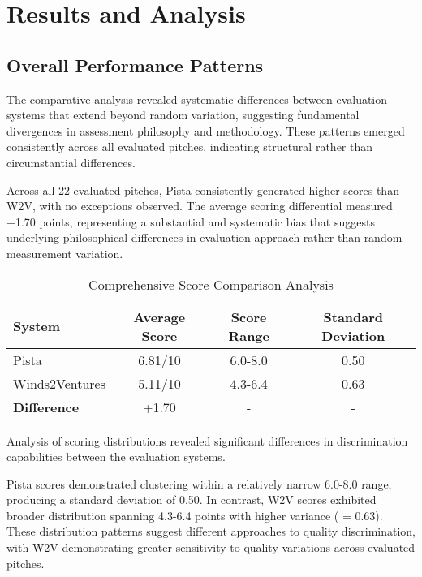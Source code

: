 \section{Results and Analysis}
\label{sec:results}

\subsection{Overall Performance Patterns}
\label{subsec:performance}

The comparative analysis revealed systematic differences between evaluation systems that extend beyond random variation, suggesting fundamental divergences in assessment philosophy and methodology. These patterns emerged consistently across all evaluated pitches, indicating structural rather than circumstantial differences.

Across all 22 evaluated pitches, Pista consistently generated higher scores than W2V, with no exceptions observed. The average scoring differential measured +1.70 points, representing a substantial and systematic bias that suggests underlying philosophical differences in evaluation approach rather than random measurement variation.

\begin{table}[ht]
    \centering
    \caption{Comprehensive Score Comparison Analysis}
    \label{tab:score-comparison}
    \begin{tabular}{lccc}
        \toprule
        \textbf{System} & \textbf{Average Score} & \textbf{Score Range} & \textbf{Standard Deviation} \\
        \midrule
        Pista & 6.81/10 & 6.0-8.0 & 0.50 \\
        Winds2Ventures & 5.11/10 & 4.3-6.4 & 0.63 \\
        \midrule
        \textbf{Difference} & +1.70 & - & - \\
        \bottomrule
    \end{tabular}
\end{table}

Analysis of scoring distributions revealed significant differences in discrimination capabilities between the evaluation systems.

Pista scores demonstrated clustering within a relatively narrow 6.0-8.0 range, producing a standard deviation of 0.50. In contrast, W2V scores exhibited broader distribution spanning 4.3-6.4 points with higher variance ( = 0.63). These distribution patterns suggest different approaches to quality discrimination, with W2V demonstrating greater sensitivity to quality variations across evaluated pitches.

